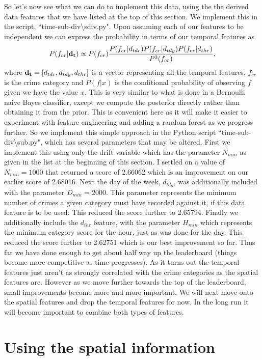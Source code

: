\documentclass[12pt,notitlepage]{article}
\begin{document}
So let's now see what we can do to implement this data, using the the derived data features that we have listed at the top of this section. We implement this in the script, ``time-sub-div\textbackslash sdiv.py". Upon  assuming each of our features to be independent we can express the probability in terms of our temporal features as
%
\begin{equation}
P(f_{cr}|{\bf d_t})  \propto P(f_{cr}) \frac{P(f_{cr}|d_{tdr})P(f_{cr}|d_{tdy})P(f_{cr}|d_{thr})}{P^3(f_{cr})},
\end{equation}
where ${\bf d_t} = [d_{tdr},d_{tdy},d_{thr}]$ is a vector representing all the temporal features, $f_{cr}$  is the crime category and $P(f|x)$ is the conditional probability of observing $f$ given we have the value $x$. This is very similar to what is done in a Bernoulli naive Bayes classifier, except we compute the posterior directly rather than obtaining it from the prior. This is convenient here as it will make it easier to experiment with feature engineering and adding a random forest as we progress further.
	So we implement this simple approach in the Python script ``time-sub-div\textbackslash sub.py", which has several parameters that may be altered. First we implement this using only the drift variable which has the parameter $N_{min}$ as given in the list at the beginning of this section. I settled on a value of $N_{min} = 1000$ that returned a score of 2.66062 which is an improvement on our earlier score of 2.68016. Next the day of the week, $d_{tdy}$, was additionally included with the parameter $D_{min}=2000$. This parameter represents the minimum number of crimes a given category must have recorded against it, if this data feature is to be used. This reduced the score further to 2.65794. Finally we additionally include the $d_{thr}$ feature, with the parameter $H_{min}$ which represents the minimum category score for the hour, just as was done for the day. This reduced the score further to 2.62751 which is our best improvement so far. 
	Thus far we have done enough to get about half way up the leaderboard (things become more competitive as time progresses). As it turns out the temporal features just aren't as strongly correlated with the crime categories as the spatial features are. However as we move further towards the top of the leaderboard, small improvements become more and more important. We will next move onto the spatial features and drop the temporal features for now. In the long run it will become important to combine both types of features.

\section{Using the spatial information}
\end{document}
